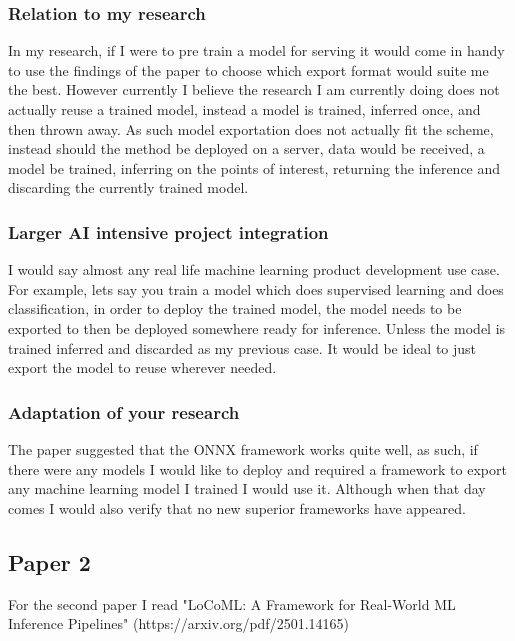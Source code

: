 \documentclass{article}
\begin{document}
\subsubsection{Relation to my research}
In my research, if I were to pre train a model for serving it would come in handy to use the findings of the paper to choose which export format would suite me the best. However currently I believe the research I am currently doing does not actually reuse a trained model, instead a model is trained, inferred once, and then thrown away. As such model exportation does not actually fit the scheme, instead should the method be deployed on a server, data would be received, a model be trained, inferring on the points of interest, returning the inference and discarding the currently trained model.

\subsubsection{Larger AI intensive project integration}
I would say almost any real life machine learning product development use case. For example, lets say you train a model which does supervised learning and does classification, in order to deploy the trained model, the model needs to be exported to then be deployed somewhere ready for inference. Unless the model is trained inferred and discarded as my previous case. It would be ideal to just export the model to reuse wherever needed.

\subsubsection{Adaptation of your research}
The paper suggested that the ONNX framework works quite well, as such, if there were any models I would like to deploy and required a framework to export any machine learning model I trained I would use it. Although when that day comes I would also verify that no new superior frameworks have appeared.

\subsection{Paper 2}
For the second paper I read "LoCoML: A Framework for Real-World ML Inference Pipelines" (https://arxiv.org/pdf/2501.14165)
\end{document}
